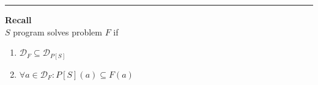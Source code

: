 \documentclass[12pt]{article}
\begin{document}
\rule{\textwidth}{0.4pt}
\textbf{Recall}\\
$S$ program solves problem $F$ if
\begin{enumerate}
	\item $\mathcal{D}_F \subseteq \mathcal{D}_{P[S]}$
	\item $\forall a \in \mathcal{D}_F\colon P[S](a) \subseteq F(a)$
\end{enumerate}  		
\end{document}
